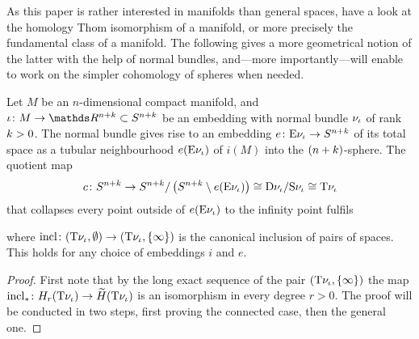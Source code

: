 As this paper is rather interested in manifolds than general spaces,
have a look at the homology Thom isomorphism of a manifold, or more
precisely the fundamental class of a manifold. The following gives a
more geometrical notion of the latter with the help of normal bundles,
and---more importantly---will enable to work on the simpler
cohomology of spheres when needed.
\begin{Lem}\label{lem:thomisofundcl}
  Let $M$ be an $n$-dimensional compact manifold, and
  $\emb\colon M\to\R^{n+\rkk}\subset\Sphere{n+\rkk}$ be an embedding with
  normal bundle $\nu_{{\iota}}$ of rank $k>0$.
  The normal bundle gives rise to an embedding
  $e\colon \mathrm{E}\nu_{{\iota}}\to S^{n+k}$ of its total space
  as a tubular neighbourhood $e(\mathrm{E}\nu_{{\iota}})$ of $i(M)$ into the
  $(n+k)$-sphere.
  The quotient map
  \begin{gather*}
    c\colon
    S^{n+k}
    \to S^{n+k}/\left( S^{n+k}\setminus e(\mathrm{E}\nu_{{\iota}}) \right)
    \cong \mathrm{D}\nu_{{\iota}} / \mathrm{S}\nu_{{\iota}}
    \cong \mathrm{T}{\nu_{{\iota}}}
  \end{gather*}
  that collapses every point outside of $e(\mathrm{E}\nu_{{\iota}})$ to the infinity
  point fulfils
  \begin{center}
  \end{center}
  where $\mathrm{incl}\colon(\mathrm{T}{\nu_{{\iota}}},\emptyset)\to(\mathrm{T}{\nu_{{\iota}}}, \{\infty\})$ is the
  canonical inclusion of pairs of spaces.
  This holds for any choice of embeddings $i$ and $e$.
  \begin{proof}
    First note that by the long exact sequence of the pair 
     $(\mathrm{T}{\nu_{{\iota}}}, \{\infty\})$ the map
     ${\mathrm{incl}}_*\colon H_r(\mathrm{T}{\nu_{{\iota}}})\to \widetilde{H}(\mathrm{T}{\nu_{{\iota}}})$
    is an isomorphism in every degree $r>0$. The proof will be
    conducted in two steps, first proving the connected case, then
    the general one.
    

\end{proof}
\end{Lem}
